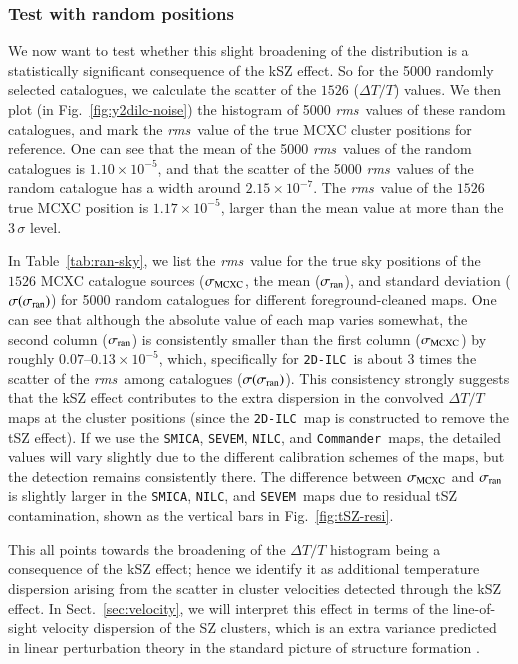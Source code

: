 \documentclass[traditabstract, longauth]{aa}
\newcommand{\nilc}{{\tt NILC}}
\newcommand{\sevem}{{\tt SEVEM}}
\newcommand{\smica}{{\tt SMICA}}
\newcommand{\commander}{{\tt Commander}}
\newcommand{\twodilc}{{\tt 2D-ILC}}
\newcommand{\1}{\'\i }
\def \rms{{\it rms}}
\begin{document}
\subsubsection{Test with random positions}
\label{sec:random-posi-test}

We now want to test whether this slight broadening of the distribution
is a statistically significant consequence of the kSZ effect.
So for the 5000 randomly selected catalogues, we calculate the scatter
of the $1526$ ($\Delta T/T$) values.
We then plot (in Fig.~\ref{fig:y2dilc-noise}) the histogram of 5000 \rms\
values of these random catalogues, and mark the \rms\ value of the true MCXC
cluster positions for reference.  One can see that the mean of the 5000
\rms\ values of the random catalogues is $1.10 \times 10^{-5}$, and that the
scatter of the 5000 \rms\ values of the random catalogue has a width around
$2.15 \times 10^{-7}$. The \rms\ value of the $1526$ true MCXC position is
$1.17 \times 10^{-5}$, larger than the mean value at more than the $3\,\sigma$
level.

In Table~\ref{tab:ran-sky}, we list the \rms\ value for the true sky positions
of the $1526$ MCXC catalogue sources ($\sigma_{\rm MCXC}$, the mean
($\sigma_{\rm ran}$), and standard deviation
($\sigma(\sigma_{\rm ran})$) for 5000 random catalogues for different
foreground-cleaned maps. One can see that although the absolute value of each
map varies somewhat, the second column ($\sigma_{\rm ran}$) is consistently
smaller than the first column ($\sigma_{\rm MCXC}$) by roughly $0.07$--$0.13
\times 10^{-5}$, which, specifically for \twodilc\ is about $3$ times the
scatter of the \rms\ among catalogues ($\sigma(\sigma_{\rm ran})$).
This consistency strongly
suggests that the kSZ effect contributes to the extra dispersion in the
convolved $\Delta T/T$ maps at the cluster positions (since the \twodilc\ map
is constructed to remove the tSZ effect). If we use the \smica, \sevem, \nilc,
and \commander\ maps, the detailed values will vary slightly due to the
different calibration schemes of the maps, but the detection remains
consistently there.  The difference between $\sigma_{\rm MCXC}$ and
$\sigma_{\rm ran}$ is slightly larger in the \smica, \nilc, and \sevem\
maps due to residual tSZ contamination, shown as the vertical bars in Fig.~\ref{fig:tSZ-resi}.

This all points towards the broadening of the $\Delta T/T$ histogram
being a consequence of the kSZ effect; hence we identify it as additional
temperature dispersion arising from the scatter in cluster velocities
detected through the kSZ effect. In Sect.~\ref{sec:velocity}, we will interpret
this effect in terms of the line-of-sight velocity dispersion of the SZ
clusters, which is an extra variance predicted in linear
perturbation theory in the standard picture of structure formation
\citep{1980lssu.book.....P}.
\end{document}
